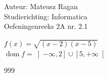 \documentclass[a4paper]{article}
\begin{document}
\noindent \large Auteur: Mateusz Ragan \\
\noindent \large Studierichting: Informatica\\
\noindent \large Oefeningenreeks 2A nr. 2.1\\

\medskip

\normalsize

$f(x) = \sqrt{(x-2)(x-5)} $ \\

$\operatorname{dom} f = \left]-\infty, 2\right]\cup\left[5,+\infty\right[$\\


\begin{thebibliography}{999}
\end{thebibliography}
\end{document}
